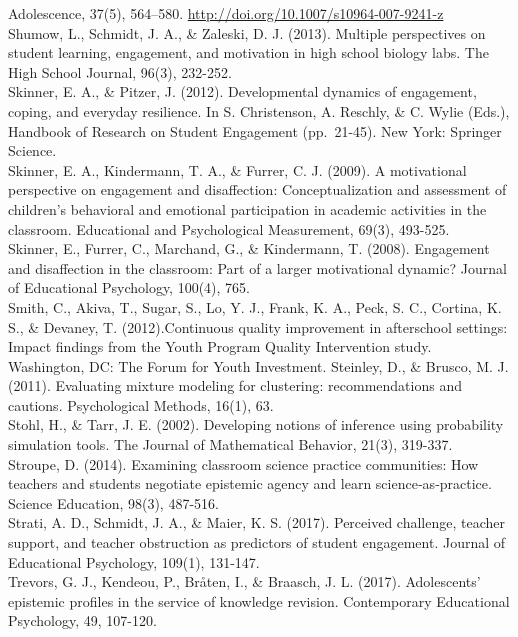 \documentclass[]{book}
\theoremstyle{definition}
\theoremstyle{definition}
\theoremstyle{definition}
\theoremstyle{remark}
\begin{document}
Adolescence, 37(5), 564--580.
\url{http://doi.org/10.1007/s10964-007-9241-z}\\
Shumow, L., Schmidt, J. A., \& Zaleski, D. J. (2013). Multiple
perspectives on student learning, engagement, and motivation in high
school biology labs. The High School Journal, 96(3), 232-252.\\
Skinner, E. A., \& Pitzer, J. (2012). Developmental dynamics of
engagement, coping, and everyday resilience. In S. Christenson, A.
Reschly, \& C. Wylie (Eds.), Handbook of Research on Student Engagement
(pp.~21-45). New York: Springer Science.\\
Skinner, E. A., Kindermann, T. A., \& Furrer, C. J. (2009). A
motivational perspective on engagement and disaffection:
Conceptualization and assessment of children's behavioral and emotional
participation in academic activities in the classroom. Educational and
Psychological Measurement, 69(3), 493-525.\\
Skinner, E., Furrer, C., Marchand, G., \& Kindermann, T. (2008).
Engagement and disaffection in the classroom: Part of a larger
motivational dynamic? Journal of Educational Psychology, 100(4), 765.\\
Smith, C., Akiva, T., Sugar, S., Lo, Y. J., Frank, K. A., Peck, S. C.,
Cortina, K. S., \& Devaney, T. (2012).Continuous quality improvement in
afterschool settings: Impact findings from the Youth Program Quality
Intervention study. Washington, DC: The Forum for Youth Investment.
Steinley, D., \& Brusco, M. J. (2011). Evaluating mixture modeling for
clustering: recommendations and cautions. Psychological Methods, 16(1),
63.\\
Stohl, H., \& Tarr, J. E. (2002). Developing notions of inference using
probability simulation tools. The Journal of Mathematical Behavior,
21(3), 319-337.\\
Stroupe, D. (2014). Examining classroom science practice communities:
How teachers and students negotiate epistemic agency and learn
science‐as‐practice. Science Education, 98(3), 487-516.\\
Strati, A. D., Schmidt, J. A., \& Maier, K. S. (2017). Perceived
challenge, teacher support, and teacher obstruction as predictors of
student engagement. Journal of Educational Psychology, 109(1),
131-147.\\
Trevors, G. J., Kendeou, P., Bråten, I., \& Braasch, J. L. (2017).
Adolescents' epistemic profiles in the service of knowledge revision.
Contemporary Educational Psychology, 49, 107-120.\\
\end{document}
